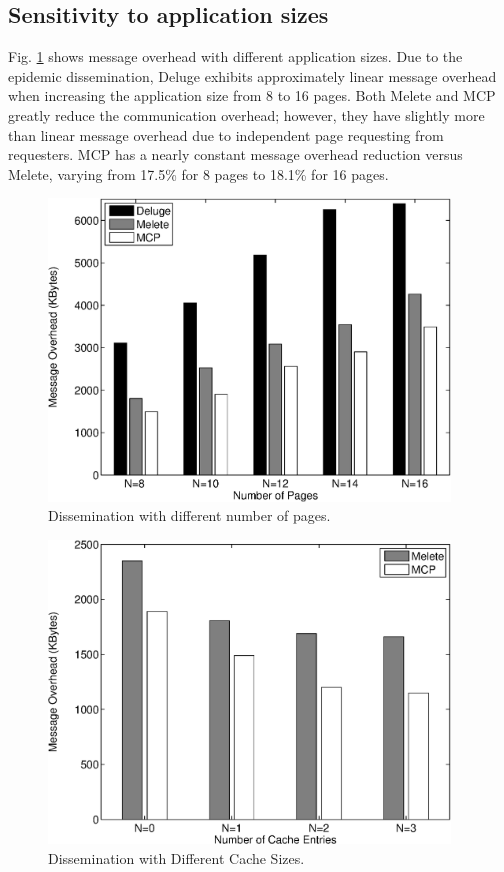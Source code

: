 \subsection{Sensitivity to application sizes}
Fig. \ref{fnumPage} shows message overhead with different application sizes. 
Due to the epidemic dissemination, Deluge exhibits approximately linear message overhead when
increasing the application size from 8 to 16 pages. Both Melete and MCP greatly reduce the communication overhead; however, they have slightly more than linear message overhead due to independent page requesting from requesters. MCP has a nearly constant message overhead reduction versus Melete, varying from 17.5\% for 8 pages to 18.1\% for 16 pages.

\begin{figure}[htbp]
\centering
\includegraphics[width=4.2in]{figures/fdist2.eps}
\caption{Dissemination with different number of pages.}
\label{fnumPage}
\end{figure}
\begin{figure}[htbp]
\centering
\includegraphics[width=4.2in]{figures/fcache.eps}
\caption{Dissemination with Different Cache Sizes.}
\label{fcache}
\vspace{-0.2in}
\end{figure}


